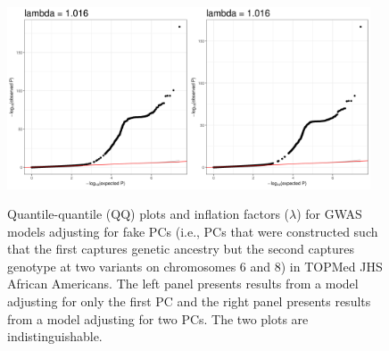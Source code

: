 \documentclass[12pt]{article}
\begin{document}
\begin{figure}[!htb]
\centering
\includegraphics[width=0.48\textwidth]{figs/fakepcs/beta2_1pcs_fake_qq}\includegraphics[width=0.48\textwidth]{figs/fakepcs/beta2_2pcs_fake_qq}
\caption[QQ plots for GWAS models adjusting for fake PCs in TOPMed JHS.]{Quantile-quantile (QQ) plots and inflation factors ($\lambda$) for GWAS models adjusting for fake PCs (i.e., PCs that were constructed such that the first captures genetic ancestry but the second captures genotype at two variants on chromosomes 6 and 8) in TOPMed JHS African Americans. The left panel presents results from a model adjusting for only the first PC and the right panel presents results from a model adjusting for two PCs. The two plots are indistinguishable.}
\label{fig:qq-fake}
\end{figure}





\end{document}
